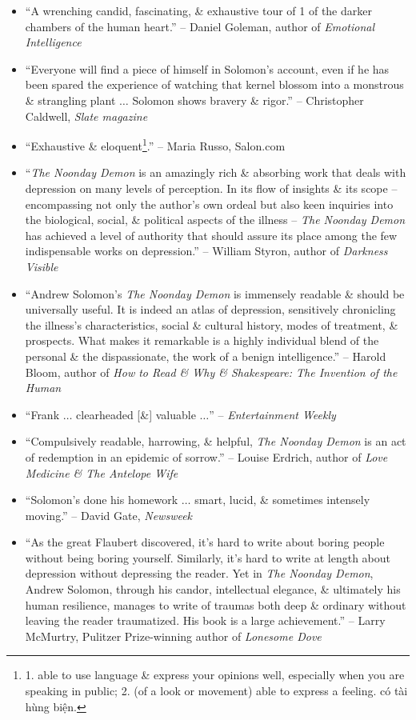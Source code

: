 \documentclass{article}
\begin{document}
\begin{enumerate}
\begin{itemize}
		\item ``A wrenching candid, fascinating, \& exhaustive tour of 1 of the darker chambers of the human heart.'' -- {\sc Daniel Goleman}, author of {\it Emotional Intelligence}
		\item ``Everyone will find a piece of himself in Solomon's account, even if he has been spared the experience of watching that kernel blossom into a monstrous \& strangling plant $\ldots$ Solomon shows bravery \& rigor.'' -- {\sc Christopher Caldwell}, {\it Slate magazine}
		\item ``Exhaustive \& eloquent\footnote{1. able to use language \& express your opinions well, especially when you are speaking in public; 2. (of a look or movement) able to express a feeling. có tài hùng biện.}.'' -- {\sc Maria Russo}, Salon.com
		\item ``{\it The Noonday Demon} is an amazingly rich \& absorbing work that deals with depression on many levels of perception. In its flow of insights \& its scope -- encompassing not only the author's own ordeal but also keen inquiries into the biological, social, \& political aspects of the illness -- {\it The Noonday Demon} has achieved a level of authority that should assure its place among the few indispensable works on depression.'' -- {\sc William Styron}, author of {\it Darkness Visible}
		\item ``{\sc Andrew Solomon}'s {\it The Noonday Demon} is immensely readable \& should be universally useful. It is indeed an atlas of depression, sensitively chronicling the illness's characteristics, social \& cultural history, modes of treatment, \& prospects. What makes it remarkable is a highly individual blend of the personal \& the dispassionate, the work of a benign intelligence.'' -- {\sc Harold Bloom}, author of {\it How to Read \& Why \& Shakespeare: The Invention of the Human}
		\item ``Frank $\ldots$ clearheaded [\&] valuable $\ldots$'' -- {\it Entertainment Weekly}
		\item ``Compulsively readable, harrowing, \& helpful, {\it The Noonday Demon} is an act of redemption in an epidemic of sorrow.'' -- {\sc Louise Erdrich}, author of {\it Love Medicine \& The Antelope Wife}
		\item ``{\sc Solomon}'s done his homework $\ldots$ smart, lucid, \& sometimes intensely moving.'' -- {\sc David Gate}, {\it Newsweek}
		\item ``As the great Flaubert discovered, it's hard to write about boring people without being boring yourself. Similarly, it's hard to write at length about depression without depressing the reader. Yet in {\it The Noonday Demon}, {\sc Andrew Solomon}, through his candor, intellectual elegance, \& ultimately his human resilience, manages to write of traumas both deep \& ordinary without leaving the reader traumatized. His book is a large achievement.'' -- {\sc Larry McMurtry}, Pulitzer Prize-winning author of {\it Lonesome Dove}

\end{itemize}
\end{enumerate}
\end{document}
